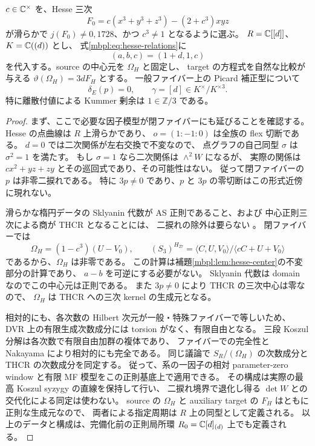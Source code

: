\begin{proposition}[自然な周期位相の二捩れ境界における剰余]
\label{mbpd:prop:boundary-phase}
$c\in\mathbb C^\times$ を、Hesse 三次
\[
 F_0=c(x^3+y^3+z^3)-(2+c^3)xyz
\]
が滑らかで $j(F_0)\ne0,1728$、かつ $c^3\ne1$ となるように選ぶ。
$R=\mathbb C[[d]]$、$K=\mathbb C((d))$ とし、
式\eqref{mbpl:eq:hesse-relations}に
\[
 (a,b,c)=(1+d,1,c)
\]
を代入する。source の中心元を $\Omega_H$ と固定し、
target の方程式を自然な比較が与える
$\vartheta(\Omega_H)=3dF_H$ とする。
一般ファイバー上の Picard 補正型について
\begin{equation}\label{mbpd:eq:boundary-phase}
 \delta_E(p)=0,\qquad
 \gamma=[d]\in K^\times/K^{\times3}.
\end{equation}
特に離散付値による Kummer 剰余は $1\in\mathbb Z/3$ である。
\end{proposition}
\begin{proof}
まず、ここで必要な因子模型が閉ファイバーにも延びることを確認する。
Hesse の点曲線は $R$ 上滑らかであり、
$o=(1:-1:0)$ は全族の flex 切断である。
$d=0$ では二次関係が左右交換で不変なので、
点グラフの自己同型 $\sigma$ は $\sigma^2=1$ を満たす。
もし $\sigma=1$ なら二次関係は $\wedge^2W$ になるが、
実際の関係は $cx^2+yz+zy$ とその巡回式であり、その可能性はない。
従って閉ファイバーの $p$ は非零二捩れである。
特に $3p\ne0$ であり、$p$ と $3p$ の零切断はこの形式近傍に現れない。

滑らかな楕円データの Sklyanin 代数が AS 正則であること、および
中心正則三次による商が THCR となることには、
二捩れの除外は要らない
\cite[Theorems~6.6, 6.8]{GRSklyaninATV}
\cite[\S1, pp.~19--21]{GRSklyaninST}。
閉ファイバーでは
\[
 \Omega_H=(1-c^3)(U-V_0),
 \qquad
 (S_3)^{H_{27}}
 =\langle C,U,V_0\rangle/\langle cC+U+V_0\rangle
\]
であるから、$\Omega_H$ は非零である。
この計算は補題\ref{mbpl:lem:hesse-center}の不変部分の計算であり、
$a-b$ を可逆にする必要がない。
Sklyanin 代数は domain なのでこの中心元は正則である。
また $3p\ne0$ により THCR の三次中心は零なので、
$\Omega_H$ は THCR への三次 kernel の生成元となる。

相対的にも、各次数の Hilbert 次元が一般・特殊ファイバーで等しいため、
DVR 上の有限生成次数成分には torsion がなく、有限自由となる。
三段 Koszul 分解は各次数で有限自由加群の複体であり、
ファイバーでの完全性と Nakayama により相対的にも完全である。
同じ議論で $S_R/(\Omega_H)$ の次数成分と THCR の次数成分を同定する。
従って、系の一因子の相対
parameter-zero window と有限 MF 模型をこの正則基底上で適用できる。
その構成は実際の最高 Koszul syzygy の直線を保持して行い、
二捩れ境界で退化し得る $\det W$ との交代化による同定は使わない。
source の $\Omega_H$ と auxiliary target の $F_H$ はともに正則な生成元なので、
両者による指定周期は $R$ 上の同型として定義される。
以上のデータと構成は、完備化前の正則局所環
$R_0=\mathbb C[d]_{(d)}$ 上でも定義される。


\end{proof}
